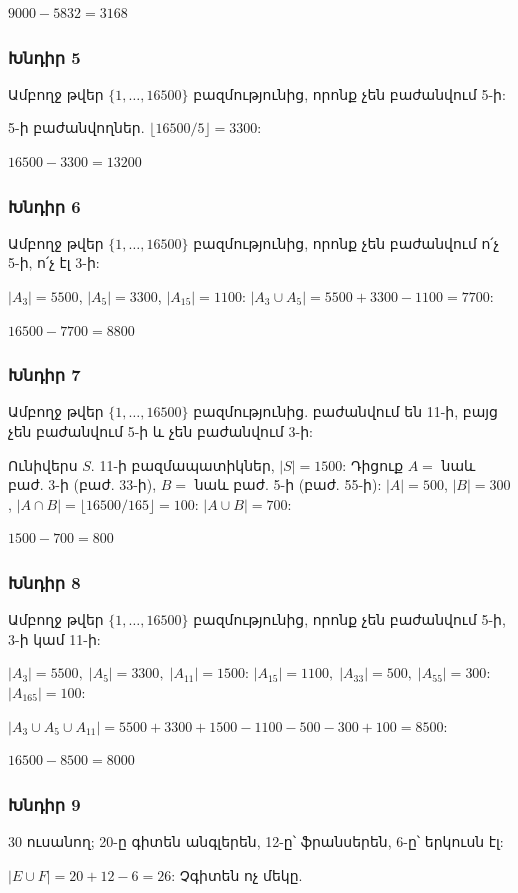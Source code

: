 $\boxed{9000-5832=3168}$

\subsubsection*{Խնդիր 5}
Ամբողջ թվեր $\{1,\dots,16500\}$ բազմությունից, որոնք չեն բաժանվում 5-ի:

5-ի բաժանվողներ. $\lfloor 16500/5\rfloor = 3300$:

$\boxed{16500-3300=13200}$

\subsubsection*{Խնդիր 6}
Ամբողջ թվեր $\{1,\dots,16500\}$ բազմությունից, որոնք չեն բաժանվում ո՛չ 5-ի, ո՛չ էլ 3-ի:

$|A_3|=5500$, $|A_5|=3300$, $|A_{15}|=1100$:
$|A_3\cup A_5|=5500+3300-1100=7700$:

$\boxed{16500-7700=8800}$

\subsubsection*{Խնդիր 7}
Ամբողջ թվեր $\{1,\dots,16500\}$ բազմությունից. բաժանվում են 11-ի, բայց չեն բաժանվում 5-ի և չեն բաժանվում 3-ի:

Ունիվերս $S$. 11-ի բազմապատիկներ, $|S|=1500$: Դիցուք $A=$ նաև բաժ. 3-ի (բաժ. 33-ի), $B=$ նաև բաժ. 5-ի (բաժ. 55-ի):
$|A|=500$, $|B|=300$, $|A\cap B|=\lfloor 16500/165\rfloor=100$:
$|A\cup B|=700$:

$\boxed{1500-700=800}$

\subsubsection*{Խնդիր 8}
Ամբողջ թվեր $\{1,\dots,16500\}$ բազմությունից, որոնք չեն բաժանվում 5-ի, 3-ի կամ 11-ի:

$|A_3|=5500,\;|A_5|=3300,\;|A_{11}|=1500$:
$|A_{15}|=1100,\;|A_{33}|=500,\;|A_{55}|=300$:
$|A_{165}|=100$:

$|A_3\cup A_5\cup A_{11}|=5500+3300+1500-1100-500-300+100=8500$:

$\boxed{16500-8500=8000}$

\subsubsection*{Խնդիր 9}
30 ուսանող; 20-ը գիտեն անգլերեն, 12-ը՝ ֆրանսերեն, 6-ը՝ երկուսն էլ:

$|E\cup F|=20+12-6=26$: Չգիտեն ոչ մեկը.

